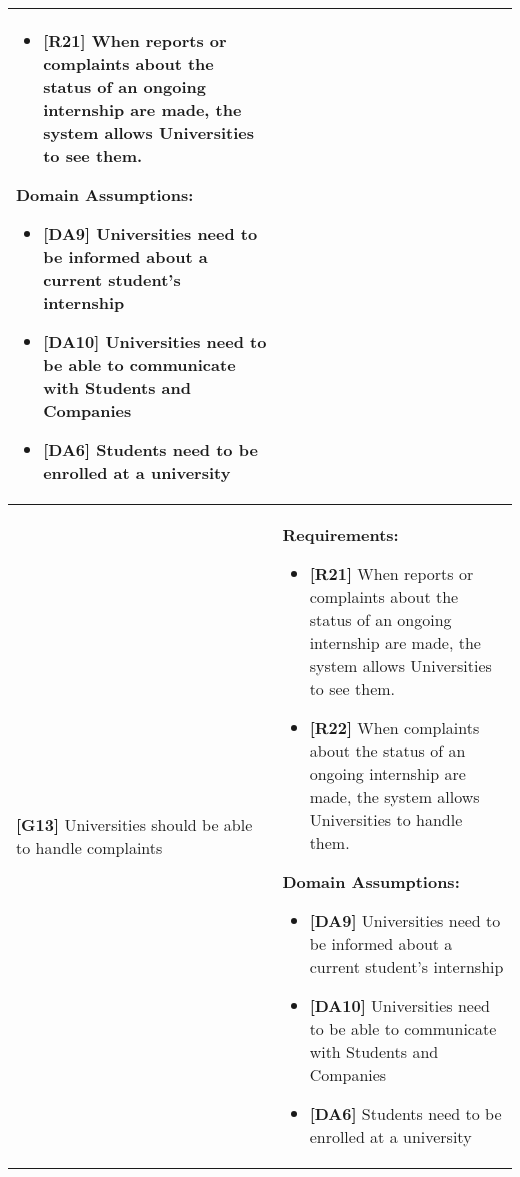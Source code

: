 \begin{longtable}{|p{}|p{}|}
\begin{itemize}


    \item \textbf{[R21]} When reports or complaints about the status of an ongoing internship are made, the system allows Universities to see them.
\end{itemize}
\textbf{Domain Assumptions:}
\begin{itemize}
    \item \textbf{[DA9]} Universities need to be informed about a current student’s internship
    \item \textbf{[DA10]} Universities need to be able to communicate with Students and Companies
    \item \textbf{[DA6]} Students need to be enrolled at a university
\end{itemize} \\
\hline
\textbf{[G13]} Universities should be able to handle complaints
& 
\textbf{Requirements:}
\begin{itemize}
    \item \textbf{[R21]} When reports or complaints about the status of an ongoing internship are made, the system allows Universities to see them.
    \item \textbf{[R22]} When complaints about the status of an ongoing internship are made, the system allows Universities to handle them.
\end{itemize}
\textbf{Domain Assumptions:}
\begin{itemize}
    \item \textbf{[DA9]} Universities need to be informed about a current student’s internship
    \item \textbf{[DA10]} Universities need to be able to communicate with Students and Companies
    \item \textbf{[DA6]} Students need to be enrolled at a university

\end{itemize} \\
\hline
\end{longtable}


